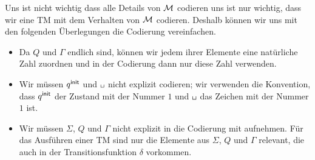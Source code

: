 Uns ist nicht wichtig dass alle Details von $\mathcal{M}$ codieren uns ist nur wichtig, 
dass wir eine \ac{TM} mit dem Verhalten von $\mathcal{M}$ codieren. 
Deshalb können wir uns mit den folgenden Überlegungen die Codierung vereinfachen.
\begin{itemize}
	\item Da $Q$ und $\Gamma$ endlich sind, können wir jedem ihrer Elemente eine natürliche Zahl zuordnen
	und in der Codierung dann nur diese Zahl verwenden.
	\item Wir müssen $q^\mathsf{init}$ und $\blank$ nicht explizit codieren; wir verwenden die Konvention,
	dass $q^\mathsf{init}$ der Zustand mit der Nummer $1$ und $\blank$ das Zeichen mit der Nummer $1$ ist.
	\item Wir müssen $\Sigma$, $Q$ und $\Gamma$ nicht explizit in die Codierung mit aufnehmen.
	Für das Ausführen einer \ac{TM} sind nur die Elemente aus $\Sigma$, $Q$ und $\Gamma$ relevant, die auch in der Transitionsfunktion $\delta$ vorkommen.
\end{itemize}



